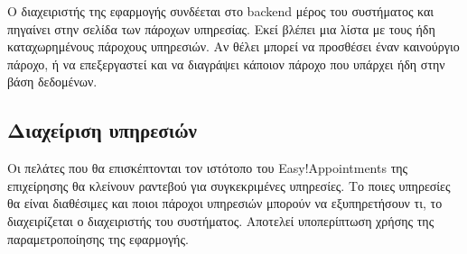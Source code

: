 Ο διαχειριστής της εφαρμογής συνδέεται στο backend μέρος του συστήματος και πηγαίνει στην σελίδα των πάροχων υπηρεσίας. Εκεί βλέπει μια λίστα με τους ήδη καταχωρημένους πάροχους υπηρεσιών. Αν θέλει μπορεί να προσθέσει έναν καινούργιο πάροχο, ή να επεξεργαστεί και να διαγράψει κάποιον πάροχο που υπάρχει ήδη στην βάση δεδομένων.

\subsection {Διαχείριση υπηρεσιών}
Οι πελάτες που θα επισκέπτονται τον ιστότοπο του Easy!Appointments της επιχείρησης θα κλείνουν ραντεβού για συγκεκριμένες υπηρεσίες. Το ποιες υπηρεσίες θα είναι διαθέσιμες και ποιοι πάροχοι υπηρεσιών μπορούν να εξυπηρετήσουν τι, το διαχειρίζεται ο διαχειριστής του συστήματος. Αποτελεί υποπερίπτωση χρήσης της παραμετροποίησης της εφαρμογής.